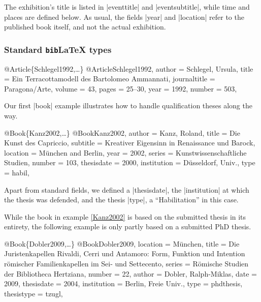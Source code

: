 \documentclass[a4paper,
10pt,
ngerman,
english
]{ltxdoc}
\begin{document}
The exhibition's title is listed in |eventtitle| and |eventsubtitle|, while time and places are defined below. As usual, the fields |year| and |location| refer to the published book itself, and not the actual exhibition.

\subsubsection{Standard \texttt{bib}\LaTeX{} types}

\begin{bibexample}[label=Schlegel1992]{{@}Article\{Schlegel1992,…\}}
@Article{Schlegel1992,
  author       = {Schlegel, Ursula},
  title        = {Ein Terracottamodell des Bartolomeo Ammannati},
  journaltitle = {Paragona/Arte},
  volume       = {43},
  pages        = {25--30},
  year         = {1992},
  number       = {503},
}
\end{bibexample}

Our first |book| example illustrates how to handle qualification theses along the way.
\begin{bibexample}[label=Kanz2002]{{@}Book\{Kanz2002,…\}}
@Book{Kanz2002,
  author      = {Kanz, Roland},
  title       = {Die Kunst des Capriccio},
  subtitle    = {Kreativer Eigensinn in Renaissance und Barock},
  location    = {München and Berlin},
  year        = {2002},
  series      = {Kunstwissenschaftliche Studien},
  number      = {103},
  thesisdate  = {2000},
  institution = {Düsseldorf, Univ.},
  type        = {habil},
}
\end{bibexample}
Apart from standard fields, we defined a |thesisdate|, the |institution| at which the thesis was defended, and the thesis |type|, a \foreignquote{german}{Habilitation} in this case.

While the book in example \ref{Kanz2002} is based on the submitted thesis in its entirety, the following example is only partly based on a submitted PhD thesis.
\begin{bibexample}[label=Dobler2009]{{@}Book\{Dobler2009,…\}}
@Book{Dobler2009,
  location = {München},
  title = {Die Juristenkapellen Rivaldi, Cerri und Antamoro: Form, Funktion und Intention römischer Familienkapellen im Sei- und Settecento},
  series = {Römische Studien der Bibliotheca Hertziana},
  number = {22},
  author = {Dobler, Ralph-Miklas},
  date = {2009},
  thesisdate = {2004},
  institution = {Berlin, Freie Univ.},
  type = {phdthesis},
  thesistype = {tzugl},
}
\end{bibexample}
\end{document}
